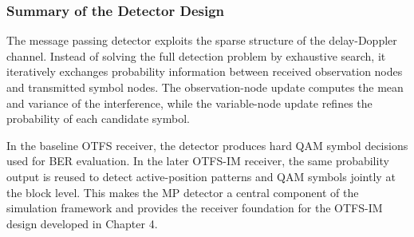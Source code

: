 \subsubsection{Summary of the Detector Design}

The message passing detector exploits the sparse structure of the delay-Doppler channel. Instead of solving the full detection problem by exhaustive search, it iteratively exchanges probability information between received observation nodes and transmitted symbol nodes. The observation-node update computes the mean and variance of the interference, while the variable-node update refines the probability of each candidate symbol.

In the baseline OTFS receiver, the detector produces hard QAM symbol decisions used for BER evaluation. In the later OTFS-IM receiver, the same probability output is reused to detect active-position patterns and QAM symbols jointly at the block level. This makes the MP detector a central component of the simulation framework and provides the receiver foundation for the OTFS-IM design developed in Chapter 4.
